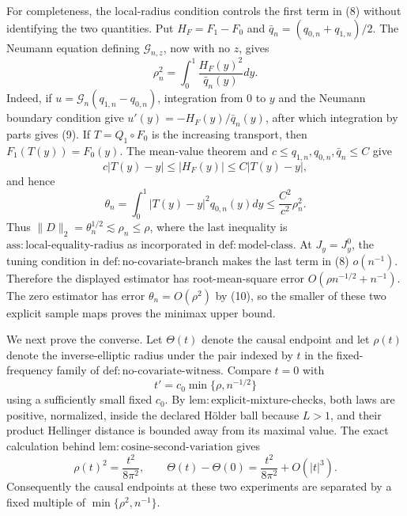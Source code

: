 For completeness, the local-radius condition controls the first term in (8) without identifying the two quantities. Put \(H_F=F_1-F_0\) and \(\bar q_n=(q_{0,n}+q_{1,n})/2\). The Neumann equation defining \(\mathcal G_{n,z}\), now with no \(z\), gives
\[
\rho_n^2=\int_0^1\frac{H_F(y)^2}{\bar q_n(y)}dy. \tag{9}
\]
Indeed, if \(u=\mathcal G_n(q_{1,n}-q_{0,n})\), integration from \(0\) to \(y\) and the Neumann boundary condition give \(u'(y)=-H_F(y)/\bar q_n(y)\), after which integration by parts gives (9). If \(T=Q_1\circ F_0\) is the increasing transport, then \(F_1(T(y))=F_0(y)\). The mean-value theorem and \(c\le q_{1,n},q_{0,n},\bar q_n\le C\) give
\[
c|T(y)-y|\le|H_F(y)|\le C|T(y)-y|,
\]
and hence
\[
\theta_n=\int_0^1|T(y)-y|^2q_{0,n}(y)dy
\le \frac{C^2}{c^2}\rho_n^2. \tag{10}
\]
Thus \(\|D\|_2=\theta_n^{1/2}\lesssim\rho_n\le\rho\), where the last inequality is \(\mathrm{ass{:}local\text{-}equality\text{-}radius}\) as incorporated in \(\mathrm{def{:}model\text{-}class}\). At \(J_y=J_y^0\), the tuning condition in \(\mathrm{def{:}no\text{-}covariate\text{-}branch}\) makes the last term in (8) \(o(n^{-1})\). Therefore the displayed estimator has root-mean-square error \(O(\rho n^{-1/2}+n^{-1})\). The zero estimator has error \(\theta_n=O(\rho^2)\) by (10), so the smaller of these two explicit sample maps proves the minimax upper bound.

We next prove the converse. Let \(\Theta(t)\) denote the causal endpoint and let \(\rho(t)\) denote the inverse-elliptic radius under the pair indexed by \(t\) in the fixed-frequency family of \(\mathrm{def{:}no\text{-}covariate\text{-}witness}\). Compare \(t=0\) with
\[
t'=c_0\min\{\rho,n^{-1/2}\}
\]
using a sufficiently small fixed \(c_0\). By \(\mathrm{lem{:}explicit\text{-}mixture\text{-}checks}\), both laws are positive, normalized, inside the declared H\"older ball because \(L>1\), and their product Hellinger distance is bounded away from its maximal value. The exact calculation behind \(\mathrm{lem{:}cosine\text{-}second\text{-}variation}\) gives
\[
\rho(t)^2=\frac{t^2}{8\pi^2},
\qquad
\Theta(t)-\Theta(0)=\frac{t^2}{8\pi^2}+O(|t|^3). \tag{11}
\]
Consequently the causal endpoints at these two experiments are separated by a fixed multiple of \(\min\{\rho^2,n^{-1}\}\).

